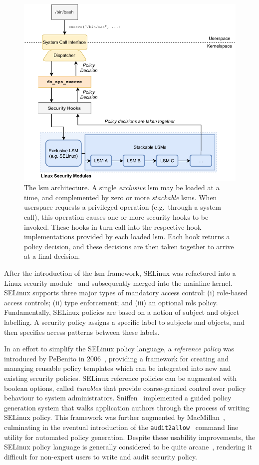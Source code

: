 \begin{figure}[htbp]
  \centering
  \includegraphics[width=0.8\linewidth]{figs/background/lsm.pdf}
  \caption[The  architecture]{
    The \gls{lsm} architecture. A single \textit{exclusive} \gls{lsm} may be loaded at a time,
    and complemented by zero or more \textit{stackable} \gls{lsm}s. When userspace
    requests a privileged operation (e.g.\ through a system call), this operation causes one
    or more security hooks to be invoked. These hooks in turn call into the respective
    hook implementations provided by each loaded \gls{lsm}. Each hook returns a policy
    decision, and these decisions are then taken together to arrive at a final decision.
  }%
  \label{fig:lsm}
\end{figure}

After the introduction of the \gls{lsm} framework, SELinux was refactored into a Linux
security module~\cite{smalley2001_selinux} and subsequently merged into the mainline
kernel. SELinux supports three major types of mandatory access control: (i) role-based
access controls; (ii) type enforcement; and (iii) an optional \gls{mls} policy.
Fundamentally, SELinux policies are based on a notion of subject and object labelling.
A security policy assigns a specific label to subjects and objects, and then specifies
access patterns between these labels.

In an effort to simplify the SELinux policy language, a \textit{reference policy} was
introduced by PeBenito in 2006~\cite{pebenito2006_refpol}, providing a framework for
creating and managing reusable policy templates which can be integrated into new and
existing security policies. SELinux reference policies can be augmented with boolean
options, called \textit{tunables} that provide coarse-grained control over policy
behaviour to system administrators. Sniffen~\cite{sniffen06_guided} implemented a guided
policy generation system that walks application authors through the process of writing
SELinux policy. This framework was further augmented by
MacMillan~\cite{macmillan07_madison}, culminating in the eventual introduction of the
\texttt{audit2allow}~\cite{audit2allow} command line utility for automated policy
generation. Despite these usability improvements, the SELinux policy language is generally
considered to be quite arcane~\cite{schreuders2012_towards}, rendering it difficult for
non-expert users to write and audit security policy.

